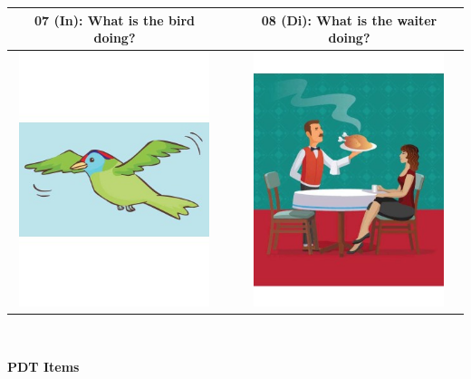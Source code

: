 \begin{tabular}{|c|c|c|}
\hline
07 (In): What is the bird doing? && 08 (Di): What is the waiter doing? \\
\hline
\includegraphics[width=15em,trim=0 0 0 -3]{figures/I07.jpg} & & \includegraphics[width=15em,trim=0 0 0 -3]{figures/I08.jpg} \\
\hline
\end{tabular}
\vspace{1em} \\


\clearpage

{ \textbf{PDT Items}}

\vspace{2em}

